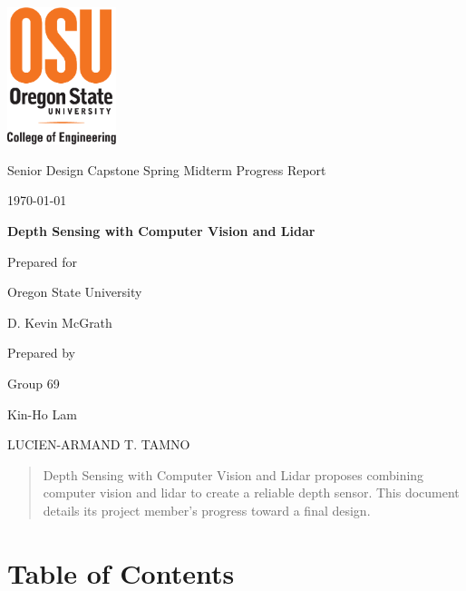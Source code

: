 \documentclass[onecolumn, draftclsnofoot,10pt, compsoc]{IEEEtran}
\def \CapstoneTeamName{			}
\def \CapstoneTeamNumber{		69}
\def \GroupMemberOne{			Kin-Ho Lam}
\def \GroupMemberTwo{ LUCIEN-ARMAND T. TAMNO}
\def \CapstoneProjectName{		Depth Sensing with Computer Vision and Lidar}
\def \CapstoneSponsorCompany{	Oregon State University}
\def \CapstoneSponsorPerson{	D. Kevin McGrath}
\def \DocType{
	Spring Midterm Progress Report
}
\newcommand{\NameSigPair}[1]{\par
	\makebox[2.75in][r]{#1} \hfil 	\makebox[3.25in]{\makebox[2.25in]{\hrulefill} \hfill		\makebox[.75in]{\hrulefill}}
	\par\vspace{-12pt} \textit{\tiny\noindent
		\makebox[2.75in]{} \hfil		\makebox[3.25in]{\makebox[2.25in][r]{Signature} \hfill	\makebox[.75in][r]{Date}}}}
\renewcommand{\NameSigPair}[1]{#1}
\begin{document}
	\begin{titlepage}
		\begin{singlespace}
			\centering
			\includegraphics[height=4cm,natwidth=345,natheight=435]{images/osu_logo.png}
			\hfill 
			\par\vspace{.2in}
			\centering
			\scshape{
				\huge Senior Design Capstone \DocType \par
				{\large\today}\par
				\vspace{.5in}
				\textbf{\Huge\CapstoneProjectName}\par
				\vfill
				{\large Prepared for}\par
				\Huge \CapstoneSponsorCompany\par
				\vspace{5pt}
				{\Large\NameSigPair{\CapstoneSponsorPerson}\par}
				{\large Prepared by }\par
				Group\CapstoneTeamNumber\par
				\CapstoneTeamName\par 
				\vspace{5pt}
				{\large
					\NameSigPair{\GroupMemberOne}\par
					\NameSigPair{\GroupMemberTwo}\par
				}
				\vspace{20pt}
			}
			\begin{abstract}  
 				Depth Sensing with Computer Vision and Lidar proposes combining computer vision and lidar to create a reliable depth sensor.
				This document details its project member's progress toward a final design.
			\end{abstract}     
		\end{singlespace}
	\end{titlepage}
\section{Table of Contents}
\tableofcontents


\clearpage
\end{document}
